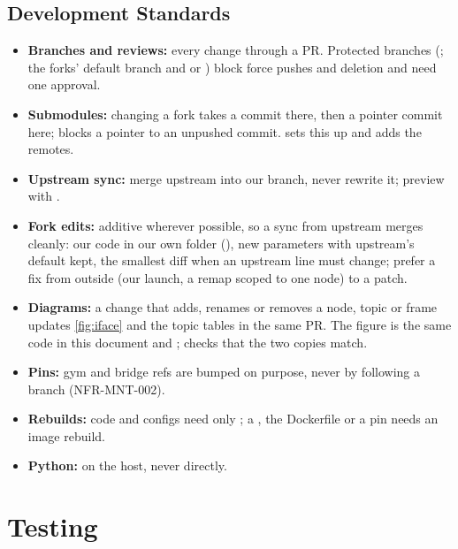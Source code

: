 \documentclass[11pt,a4paper]{article}
\begin{document}
\subsection{Development Standards}
\begin{itemize}
  \item \textbf{Branches and reviews:} every change through a PR. Protected branches (; the forks' default branch and  or ) block force pushes and deletion and need one approval.
  \item \textbf{Submodules:} changing a fork takes a commit there, then a pointer commit here;  blocks a pointer to an unpushed commit.  sets this up and adds the  remotes.
  \item \textbf{Upstream sync:} merge upstream into our branch, never rewrite it; preview with .
  \item \textbf{Fork edits:} additive wherever possible, so a sync from upstream merges cleanly: our code in our own folder (), new parameters with upstream's default kept, the smallest diff when an upstream line must change; prefer a fix from outside (our launch, a remap scoped to one node) to a patch.
  \item \textbf{Diagrams:} a change that adds, renames or removes a node, topic or frame updates \cref{fig:iface} and the topic tables in the same PR. The figure is the same code in this document and ;  checks that the two copies match.
  \item \textbf{Pins:} gym and bridge refs are bumped on purpose, never by following a branch (NFR-MNT-002).
  \item \textbf{Rebuilds:} code and configs need only ; a , the Dockerfile or a pin needs an image rebuild.
  \item \textbf{Python:}  on the host, never  directly.
\end{itemize}

\section{Testing}
\end{document}
